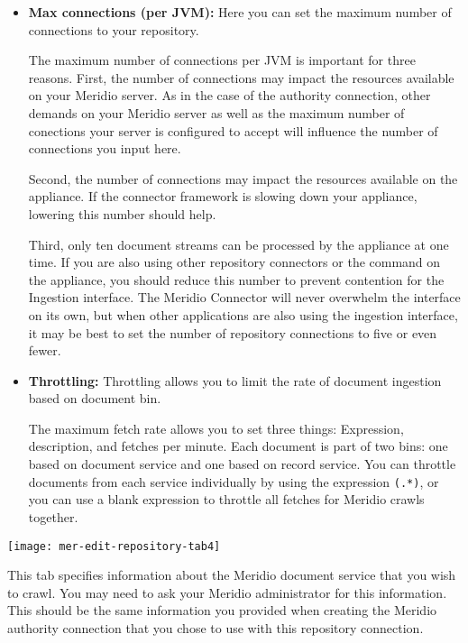\begin{itemize}

\item \textbf{Max connections (per JVM):} Here you can set the maximum
number of connections to your repository.

The maximum number of connections per JVM is important for three
reasons.  First, the number of connections may impact the resources
available on your Meridio server. As in the case of the authority
connection, other demands on your Meridio server as well as the
maximum number of conections your server is configured to accept will
influence the number of connections you input here.

Second, the number of connections may impact the resources
available on the appliance. If the connector framework is slowing down
your appliance, lowering this number should help.

Third, only ten document streams can be processed by the appliance at
one time.  If you are also using other repository connectors or the
 command on the appliance, you should reduce this
number to prevent contention for the Ingestion interface. The
Meridio Connector will never overwhelm the interface on its own,
but when other applications are also using the ingestion interface, it
may be best to set the number of repository connections to five or
even fewer.

\item \textbf{Throttling:} Throttling allows you to limit the rate of
document ingestion based on document bin.

The maximum fetch rate allows you to set three things: Expression,
description, and fetches per minute. Each document is part of two
bins: one based on document service and one based on record
service. You can throttle documents from each service individually by
using the expression \texttt{(.*)}, or you can use a blank expression
to throttle all fetches for Meridio crawls together.


\end{itemize}

\texttt{[image: mer-edit-repository-tab4]}


This tab specifies information about the Meridio document service that
you wish to crawl. You may need to ask your Meridio administrator for
this information. This should be the same information you provided
when creating the Meridio authority connection that you chose to use
with this repository connection.

